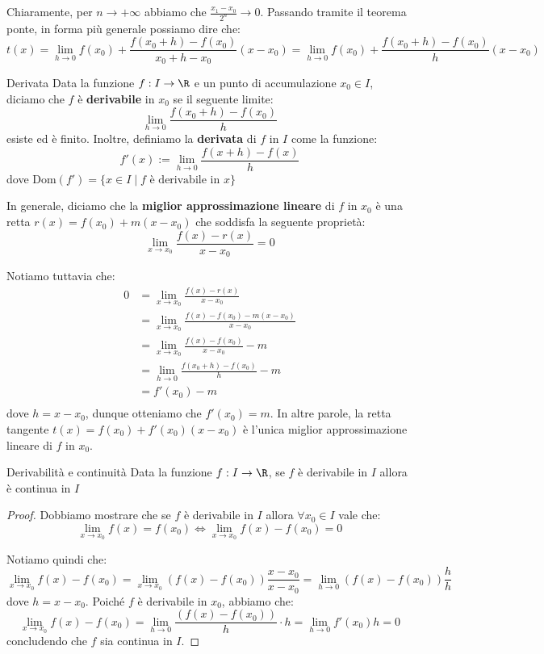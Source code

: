 \documentclass[a4paper, 12pt]{report}
\begin{document}
    Chiaramente, per $n \to +\infty$ abbiamo che $\frac{x_1-x_0}{2^n} \to 0$. Passando tramite il teorema ponte, in forma più generale possiamo dire che:
    \[t(x) = \lim_{h \to 0} f(x_0) + \frac{f(x_0 + h)-f(x_0)}{x_0 + h-x_0}(x-x_0) = \lim_{h \to 0} f(x_0) + \frac{f(x_0 + h)-f(x_0)}{h}(x-x_0)\]

    \begin{frameddefn}{Derivata}
        Data la funzione $f : I \to \R$ e un punto di accumulazione $x_0 \in I$, diciamo che $f$ è \textbf{derivabile} in $x_0$ se il seguente limite:
        \[\lim_{h \to 0} \frac{f(x_0 + h)-f(x_0)}{h}\]
        esiste ed è finito. Inoltre, definiamo la \textbf{derivata} di $f$ in $I$ come la funzione:
        \[f'(x) := \lim_{h \to 0} \frac{f(x + h)-f(x)}{h}\]
        dove $\mathrm{Dom}(f') = \{x \in I \mid f \text{ è derivabile in } x\}$
    \end{frameddefn}

    In generale, diciamo che la \textbf{miglior approssimazione lineare} di $f$ in $x_0$ è una retta $r(x) = f(x_0) + m(x-x_0)$ che soddisfa la seguente proprietà:
    \[\lim_{x \to x_0} \frac{f(x) - r(x)}{x-x_0} = 0\]
    
    Notiamo tuttavia che:
    \[\begin{split}
        0 &= \lim_{x \to x_0} \frac{f(x) - r(x)}{x-x_0} \\
        &= \lim_{x \to x_0} \frac{f(x) - f(x_0) - m(x-x_0)}{x-x_0}\\
        &= \lim_{x \to x_0} \frac{f(x) - f(x_0)}{x-x_0} - m\\
        &= \lim_{h \to 0} \frac{f(x_0+h) - f(x_0)}{h} - m\\
        &= f'(x_0) - m\\
    \end{split}\]
    dove $h = x-x_0$, dunque otteniamo che $f'(x_0) = m$. In altre parole, la retta tangente $t(x) = f(x_0) + f'(x_0)(x-x_0)$ è l'unica miglior approssimazione lineare di $f$ in $x_0$. 

    \newpage

    \begin{framedthm}{Derivabilità e continuità}
        Data la funzione $f : I \to \R$, se $f$ è derivabile in $I$ allora è continua in $I$  
    \end{framedthm}

    \begin{proof}
        Dobbiamo mostrare che se $f$ è derivabile in $I$ allora $\forall x_0 \in I$ vale che:
        \[\lim_{x \to x_0} f(x) = f(x_0) \iff \lim_{x \to x_0} f(x) - f(x_0) = 0\]

        Notiamo quindi che:
        \[\lim_{x \to x_0} f(x) - f(x_0) = \lim_{x \to x_0} (f(x) - f(x_0))\frac{x-x_0}{x-x_0} = \lim_{h \to 0} (f(x) - f(x_0))\frac{h}{h}\]
        dove $h = x-x_0$. Poiché $f$ è derivabile in $x_0$, abbiamo che:
        \[\lim_{x \to x_0} f(x) - f(x_0) = \lim_{h \to 0} \frac{(f(x) - f(x_0))}{h} \cdot h= \lim_{h \to 0} f'(x_0){h} = 0\]
        concludendo che $f$ sia continua in $I$.
    \end{proof}
\end{document}
